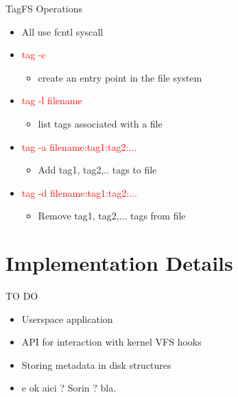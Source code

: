 \documentclass{beamer}
\begin{document}
\begin{frame}{TagFS Operations}
    \begin{itemize}
        \item {All use fcntl syscall}
		 \item \textcolor{red}{ tag -c}
            \begin{itemize}
                \item{create an entry point in the file system}
            \end{itemize}
        \item \textcolor{red}{ tag -l filename}
            \begin{itemize}
                \item{list tags associated with a file}
            \end{itemize}
        \item \textcolor{red}{ tag -a filename:tag1:tag2:...}
            \begin{itemize}
                \item{Add tag1, tag2,.. tags to file}
            \end{itemize}
        \item \textcolor{red}{ tag -d filename:tag1:tag2:...}
            \begin{itemize}
                \item{Remove tag1, tag2,... tags from file}
            \end{itemize}
    \end{itemize}
\end{frame}


\section{Implementation Details}
\begin{frame}{TO DO}
    \begin{itemize}
      \item{Userspace application}
	  \item{API for interaction with kernel VFS hooks}
	  \item{Storing metadata in disk structures}
	  \item{ e ok aici ? Sorin ? bla.}
    \end{itemize}
\end{frame}
\end{document}
